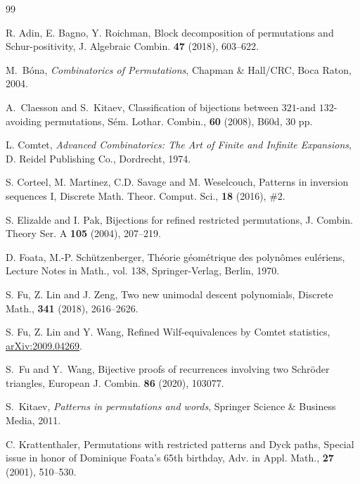 \documentclass[12pt]{amsart}
\numberwithin{equation}{section}
\theoremstyle{plain}
\theoremstyle{definition}
\begin{document}
\begin{thebibliography}{99}

 R. Adin, E. Bagno, Y. Roichman, Block decomposition of permutations and Schur-positivity, J. Algebraic Combin. {\bf47} (2018), 603--622.

 M.~B\'ona, {\em Combinatorics of Permutations}, Chapman \& Hall/CRC, Boca Raton, 2004.

 A.~Claesson and S.~Kitaev, Classification of bijections between $321$-and $132$-avoiding permutations, S\'em. Lothar. Combin., {\bf 60} (2008), B60d, 30 pp.



 L. Comtet, {\em Advanced Combinatorics: The Art of Finite and Infinite Expansions}, D. Reidel Publishing Co., Dordrecht, 1974.

 S. Corteel, M. Martinez, C.D. Savage and M. Weselcouch, Patterns in inversion sequences I,  Discrete Math. Theor. Comput. Sci., {\bf18} (2016),  $\#2$.



 S. Elizalde and I. Pak, Bijections for refined restricted permutations, J. Combin. Theory Ser. A {\bf105} (2004), 207--219.

 D. Foata, M.-P. Sch\"utzenberger, Th\'eorie g\'eom\'etrique des polyn\^omes eul\'eriens, Lecture Notes in Math., vol. 138, Springer-Verlag, Berlin, 1970.



 S. Fu, Z. Lin and J. Zeng, Two new unimodal descent polynomials, Discrete Math., {\bf341} (2018),  2616--2626.

 S. Fu, Z. Lin and Y. Wang, Refined Wilf-equivalences by Comtet statistics, \href{https://arxiv.org/abs/2009.04269}{arXiv:2009.04269}.

 S.~Fu and Y.~Wang, Bijective proofs of recurrences involving two Schr\"oder triangles, European J. Combin. {\bf86} (2020), 103077.

 S.~Kitaev, {\em Patterns in permutations and words}, Springer Science \& Business Media, 2011. 


C. Krattenthaler, Permutations with restricted patterns and Dyck paths, 
Special issue in honor of Dominique Foata's 65th birthday, Adv. in Appl. Math., {\bf27} (2001), 510--530.


\end{thebibliography}
\end{document}
